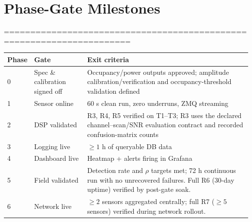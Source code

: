 \documentclass[12pt,a4paper]{report}
\begin{document}
 \section{Phase-Gate Milestones}
 ======================================================================
 \begin{table}[htbp]
 	\centering
 	\begin{tabular}{@{}llp{7.4cm}@{}}
 		\toprule
 		\textbf{Phase} & \textbf{Gate} & \textbf{Exit criteria} \\
 		\midrule
 		0 & Spec \& calibration signed off & Occupancy/power outputs approved; amplitude calibration/verification and occupancy-threshold validation defined \\
 		1 & Sensor online & 60 s clean run, zero underruns, ZMQ streaming \\
 		2 & DSP validated & R3, R4, R5 verified on T1--T3; R3 uses the declared channel--scan/SNR evaluation contract and recorded confusion-matrix counts \\
 		3 & Logging live & $\ge 1$ h of queryable DB data \\
 		4 & Dashboard live & Heatmap + alerts firing in Grafana \\
 		5 & Field validated &
 		Detection rate and $\rho$ targets met; 72 h continuous run with no
 		unrecovered failures. Full R6 (30-day uptime) verified by post-gate soak. \\
 		6 & Network live &
 		$\ge 2$ sensors aggregated centrally; full R7 ($\ge 5$ sensors) verified
 		during network rollout. \\
 		\bottomrule
 	\end{tabular}
 \end{table}
\end{document}
